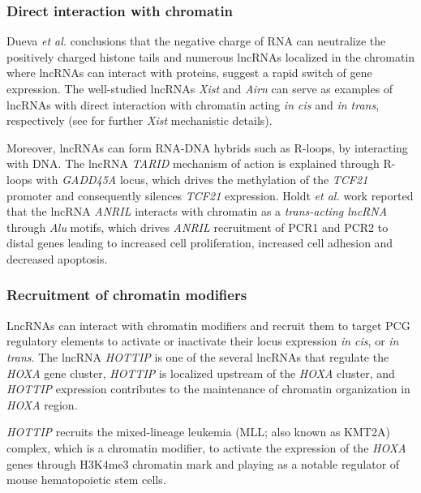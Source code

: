 \subsubsection{Direct interaction with chromatin}
\label{sub-sub-sec:direct_interaction_chr}

Dueva \textit{et al.} conclusions that the negative charge of RNA can neutralize the positively charged histone tails and numerous lncRNAs localized in the chromatin where lncRNAs can interact with proteins, suggest a rapid switch of gene expression.\autocite{dueva_2019_neutralization} The well-studied lncRNAs \textit{Xist} and \textit{Airn} can serve as examples of lncRNAs with direct interaction with chromatin acting \textit{in cis} and \textit{in trans}, respectively (see  for further \textit{Xist} mechanistic details).\autocite{loda_2019_xist,schertzer_2019_airn}

Moreover, lncRNAs can form RNA-DNA hybrids such as R-loops, by interacting with DNA. The lncRNA \textit{TARID} mechanism of action is explained through R-loops with \textit{GADD45A} locus, which drives the methylation of the \textit{TCF21} promoter and consequently silences \textit{TCF21} expression.\autocite{arab_2019_gadd45a} Holdt \textit{et al.} work reported that the lncRNA \textit{ANRIL} interacts with chromatin as a \textit{trans-acting lncRNA} through \textit{Alu} motifs, which drives \textit{ANRIL} recruitment of PCR1 and PCR2 to distal genes leading to increased cell proliferation, increased cell adhesion and decreased apoptosis.\autocite{holdt_2013_anril}

\subsubsection{Recruitment of chromatin modifiers}
\label{sub-sub-sec:recruitment_chromation_modifiers}

LncRNAs can interact with chromatin modifiers and recruit them to target PCG regulatory elements to activate or inactivate their locus expression \textit{in cis}, or \textit{in trans}. The lncRNA \textit{HOTTIP} is one of the several lncRNAs that regulate the \textit{HOXA} gene cluster, \textit{HOTTIP} is localized upstream of the \textit{HOXA} cluster, and \textit{HOTTIP} expression contributes to the maintenance of chromatin organization in \textit{HOXA} region.\autocite{wang_2011_hottip}

\textit{HOTTIP} recruits the mixed-lineage leukemia (MLL; also known as KMT2A) complex, which is a chromatin modifier, to activate the expression of the \textit{HOXA} genes through H3K4me3 chromatin mark and playing as a notable regulator of mouse hematopoietic stem cells.\autocite{luo_2019_hottip}

